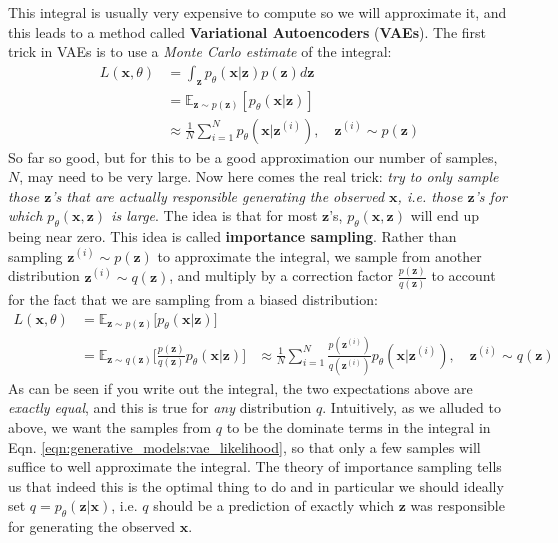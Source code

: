 This integral is usually very expensive to compute so we will approximate it, and this leads to a method called {\bf Variational Autoencoders} ({\bf VAEs}). The first trick in VAEs is to use a \textit{Monte Carlo estimate} of the integral:
\begin{align}
    L(\mathbf{x}, \theta) &= \int_{\mathbf{z}} p_{\theta}(\mathbf{x} | \mathbf{z})p(\mathbf{z})d\mathbf{z} \label{eqn:generative_models:vae_likelihood}\\
    &= \mathbb{E}_{\mathbf{z}\sim p(\mathbf{z})}[p_{\theta}(\mathbf{x} | \mathbf{z})]\\
    &\approx \frac{1}{N} \sum_{i=1}^N p_{\theta}(\mathbf{x} | \mathbf{z}^{(i)}), \quad \mathbf{z}^{(i)} \sim p(\mathbf{z})
\end{align}
So far so good, but for this to be a good approximation our number of samples, $N$, may need to be very large. Now here comes the real trick: \textit{try to only sample those $\mathbf{z}$'s that are actually responsible generating the observed $\mathbf{x}$, i.e. those $\mathbf{z}$'s for which $p_{\theta}(\mathbf{x}, \mathbf{z})$ is large}. The idea is that for most $\mathbf{z}$'s, $p_{\theta}(\mathbf{x}, \mathbf{z})$ will end up being near zero. This idea is called {\bf importance sampling}. Rather than sampling $\mathbf{z}^{(i)} \sim p(\mathbf{z})$ to approximate the integral, we sample from another distribution $\mathbf{z}^{(i)} \sim q(\mathbf{z})$, and multiply by a correction factor $\frac{p(\mathbf{z})}{q(\mathbf{z})}$ to account for the fact that we are sampling from a biased distribution:
\begin{align}
L(\mathbf{x}, \theta) &= \mathbb{E}_{\mathbf{z}\sim p(\mathbf{z})}\Big[p_{\theta}(\mathbf{x} | \mathbf{z})\Big] \label{eqn:generative_models:vae_likelihood2}\\
&= \mathbb{E}_{\mathbf{z}\sim q(\mathbf{z})}\Big[\frac{p(\mathbf{z})}{q(\mathbf{z})} p_{\theta}(\mathbf{x} | \mathbf{z})\Big]%
&\approx \frac{1}{N} \sum_{i=1}^N \frac{p(\mathbf{z}^{(i)})}{q(\mathbf{z}^{(i)})} p_{\theta}(\mathbf{x} | \mathbf{z}^{(i)}), \quad \mathbf{z}^{(i)} \sim q(\mathbf{z})
\end{align}
As can be seen if you write out the integral, the two expectations above are \textit{exactly equal}, and this is true for \textit{any} distribution $q$. Intuitively, as we alluded to above, we want the samples from $q$ to be the dominate terms in the integral in Eqn. \ref{eqn:generative_models:vae_likelihood}, so that only a few samples will suffice to well approximate the integral. The theory of importance sampling tells us that indeed this is the optimal thing to do and in particular we should ideally set $q = p_{\theta}(\mathbf{z}|\mathbf{x})$, i.e. $q$ should be a prediction of exactly which $\mathbf{z}$ was responsible for generating the observed $\mathbf{x}$. 

